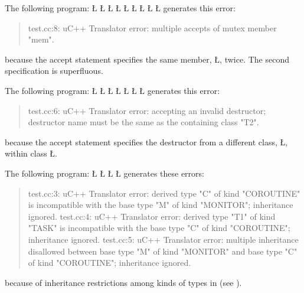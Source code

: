 \documentclass[openright,twoside]{report}
\begin{document}
The following program:
\LGinlinefalse\LGbegin\lgrinde
\L{}
\L{}
\L{\LB{}}
\L{}
\L{\LB{}}
\L{\LB{}}
\L{\LB{}}
\L{\LB{}}
\L{\LB{\};}}
\endlgrinde\LGend
generates this error:
\begin{quote}
\BGfont
test.cc:8: uC++ Translator error: multiple accepts of mutex member "mem".
\end{quote}
because the accept statement specifies the same member, \LGinlinetrue\LGbegin\lgrinde\L{}\endlgrinde\LGend{}, twice.
The second specification is superfluous.

The following program:
\LGinlinefalse\LGbegin\lgrinde
\L{}
\L{}
\L{}
\L{\LB{}}
\L{\LB{}}
\L{\LB{}}
\L{\LB{\};}}
\endlgrinde\LGend
generates this error:
\begin{quote}
\BGfont
test.cc:6: uC++ Translator error: accepting an invalid destructor; destructor name must be the same as the containing class "T2".
\end{quote}
because the accept statement specifies the destructor from a different class, \LGinlinetrue\LGbegin\lgrinde\L{}\endlgrinde\LGend{}, within class \LGinlinetrue\LGbegin\lgrinde\L{}\endlgrinde\LGend{}.

The following program:
\LGinlinefalse\LGbegin\lgrinde
\L{}
\L{}
\L{}
\L{}
\endlgrinde\LGend
generates these errors:
\begin{quote}
\BGfont
test.cc:3: uC++ Translator error: derived type "C" of kind "COROUTINE" is incompatible with the base type "M" of kind "MONITOR"; inheritance ignored.
\newline
test.cc:4: uC++ Translator error: derived type "T1" of kind "TASK" is incompatible with the base type "C" of kind "COROUTINE"; inheritance ignored.
\newline
test.cc:5: uC++ Translator error: multiple inheritance disallowed between base type "M" of kind "MONITOR" and base type "C" of kind "COROUTINE"; inheritance ignored.
\end{quote}
because of inheritance restrictions among kinds of types in \uC (see ).
\end{document}
